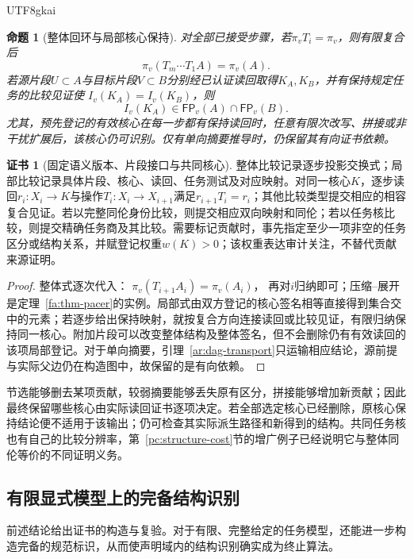 \documentclass[11pt,a4paper]{article}
\theoremstyle{plain}
\newtheorem{proposition}[theorem]{命题}
\theoremstyle{definition}
\newtheorem*{certificate}{证书}
\theoremstyle{remark}
\begin{document}
\begin{CJK*}{UTF8}{gkai}
\begin{proposition}[整体回环与局部核心保持]
\label{ar:invariants}
对全部已接受步骤，若$\pi_v T_i=\pi_v$，则有限复合后
\[
 \pi_v(T_m\cdots T_1 A)=\pi_v(A).
\]
若源片段$U\subset A$与目标片段$V\subset B$分别经已认证读回取得$K_A,K_B$，并有保持规定任务的比较见证使
$I_v(K_A)=I_v(K_B)$，则
\[
 I_v(K_A)\in\mathsf{FP}_v(A)\cap\mathsf{FP}_v(B).
\]
尤其，预先登记的有效核心在每一步都有保持读回时，任意有限次改写、拼接或非干扰扩展后，该核心仍可识别。仅有单向摘要推导时，仍保留其有向证书依赖。
\end{proposition}
\begin{certificate}[固定语义版本、片段接口与共同核心]
整体比较记录逐步投影交换式；局部比较记录具体片段、核心、读回、任务测试及对应映射。对同一核心$K$，逐步读回$r_i:X_i\to K$与操作$T_i:X_i\to X_{i+1}$满足$r_{i+1}T_i=r_i$；其他比较类型提交相应的相容复合见证。若以完整同伦身份比较，则提交相应双向映射和同伦；若以任务核比较，则提交精确任务商及其比较。需要标记贡献时，事先指定至少一项非空的任务区分或结构关系，并赋登记权重$w(K)>0$；该权重表达审计关注，不替代贡献来源证明。
\end{certificate}
\begin{proof}
整体式逐次代入：
$\pi_v(T_{i+1}A_i)=\pi_v(A_i)$，
再对$i$归纳即可；压缩--展开是定理~\ref{fa:thm-pacer}的实例。局部式由双方登记的核心签名相等直接得到集合交中的元素；若逐步给出保持映射，就按复合方向连接读回或比较见证，有限归纳保持同一核心。附加片段可以改变整体结构及整体签名，但不会删除仍有有效读回的该项局部登记。对于单向摘要，引理~\ref{ar:dag-transport}只运输相应结论，源前提与实际父边仍在构造图中，故保留的是有向依赖。
\end{proof}

节选能够删去某项贡献，较弱摘要能够丢失原有区分，拼接能够增加新贡献；因此最终保留哪些核心由实际读回证书逐项决定。若全部选定核心已经删除，原核心保持结论便不适用于该输出；仍可检查其实际派生路径和新得到的结构。共同任务核也有自己的比较分辨率，第~\ref{pc:structure-cost}节的增广例子已经说明它与整体同伦等价的不同证明义务。

\subsection{有限显式模型上的完备结构识别}
\label{ar:finite-recognition}

前述结论给出证书的构造与复验。对于有限、完整给定的任务模型，还能进一步构造完备的规范标识，从而使声明域内的结构识别确实成为终止算法。


\end{CJK*}
\end{document}
